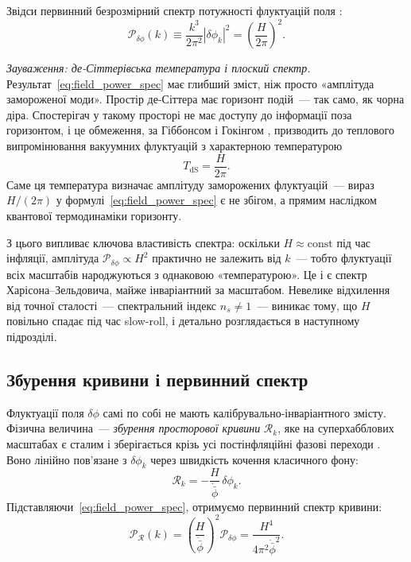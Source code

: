 \documentclass[12pt, a4paper]{article}
\begin{document}
Звідси первинний безрозмірний спектр потужності флуктуацій поля
\cite{mukhanov_chibisov_1981}:
\begin{equation}\label{eq:field_power_spec}
  \mathcal{P}_{\delta\phi}(k)
    \equiv \frac{k^3}{2\pi^2}|\delta\phi_k|^2
    = \left(\frac{H}{2\pi}\right)^{\!2}.
\end{equation}

\textit{Зауваження: де-Сіттерівська температура і плоский спектр.}
Результат~\eqref{eq:field_power_spec} має глибший зміст, ніж
просто «амплітуда замороженої моди». Простір де-Сіттера має
горизонт подій~--- так само, як чорна діра. Спостерігач у такому
просторі не має доступу до інформації поза горизонтом, і це
обмеження, за Гіббонсом і Гокінгом \cite{gibbons_hawking_1977},
призводить до теплового випромінювання вакуумних флуктуацій з
характерною температурою
\begin{equation*}
  T_\mathrm{dS} = \frac{H}{2\pi}.
\end{equation*}
Саме ця температура визначає амплітуду заморожених флуктуацій~---
вираз $H/(2\pi)$ у формулі~\eqref{eq:field_power_spec} є не
збігом, а прямим наслідком квантової термодинаміки горизонту.

З цього випливає ключова властивість спектра: оскільки $H \approx
\mathrm{const}$ під час інфляції, амплітуда $\mathcal{P}_{\delta\phi}
\propto H^2$ практично не залежить від $k$~--- тобто флуктуації
всіх масштабів народжуються з однаковою «температурою».
Це і є спектр Харісона--Зельдовича, майже інваріантний за
масштабом. Невелике відхилення від точної сталості~---
спектральний індекс $n_s \neq 1$~--- виникає тому, що $H$
повільно спадає під час slow-roll, і детально розглядається
в наступному підрозділі.


\subsection{Збурення кривини і первинний спектр}

Флуктуації поля $\delta\phi$ самі по собі не мають
калібрувально-інваріантного змісту. Фізична величина~---
\emph{збурення просторової кривини} $\mathcal{R}_k$, яке на
суперхабблових масштабах є сталим і зберігається крізь усі
постінфляційні фазові переходи \cite{bardeen_1980}. Воно
лінійно пов'язане з $\delta\phi_k$ через швидкість кочення
класичного фону:
\begin{equation}\label{eq:curvature_perturbation}
  \mathcal{R}_k = -\frac{H}{\dot{\bar{\phi}}}\,\delta\phi_k.
\end{equation}
Підставляючи~\eqref{eq:field_power_spec}, отримуємо первинний
спектр кривини:
\begin{equation}\label{eq:curvature_power_spec}
  \mathcal{P}_{\mathcal{R}}(k)
    = \left(\frac{H}{\dot{\bar{\phi}}}\right)^{\!2}
      \mathcal{P}_{\delta\phi}
    = \frac{H^4}{4\pi^2\dot{\bar{\phi}}^2}.
\end{equation}
\end{document}

